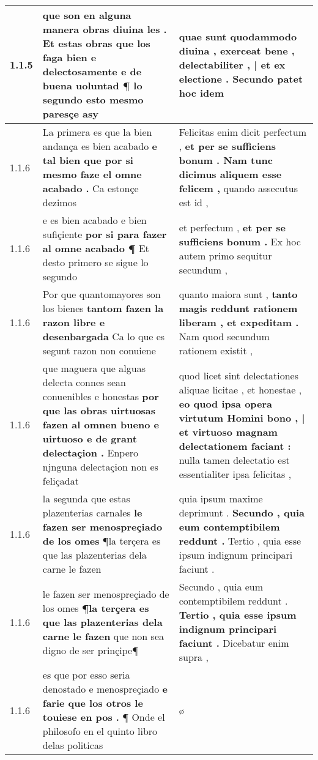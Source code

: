 \begin{tabular}{|p{1cm}|p{6.5cm}|p{6.5cm}|}
1.1.5 & que son en alguna manera obras diuina les . \textbf{ Et estas obras que los faga bien e delectosamente e de buena uoluntad } ¶ lo segundo esto mesmo paresçe asy & quae sunt quodammodo diuina , \textbf{ exerceat bene , delectabiliter , | et ex electione . } Secundo patet hoc idem \\\hline
1.1.6 & La primera es que la bien andança es bien acabado \textbf{ e tal bien que por si mesmo faze el omne acabado . } Ca estonçe dezimos & Felicitas enim dicit perfectum , \textbf{ et per se sufficiens bonum . Nam tunc dicimus aliquem esse felicem , } quando assecutus est id , \\\hline
1.1.6 & e es bien acabado e bien sufiçiente \textbf{ por si para fazer al omne acabado ¶ } Et desto primero se sigue lo segundo & et perfectum , \textbf{ et per se sufficiens bonum . } Ex hoc autem primo sequitur secundum , \\\hline
1.1.6 & Por que quantomayores son los bienes \textbf{ tantom fazen la razon libre e desenbargada } Ca lo que es segunt razon non conuiene & quanto maiora sunt , \textbf{ tanto magis reddunt rationem liberam , et expeditam . } Nam quod secundum rationem existit , \\\hline
1.1.6 & que maguera que alguas delecta connes sean conuenibles e honestas \textbf{ por que las obras uirtuosas fazen al omnen bueno e uirtuoso e de grant delectaçion . } Enpero njnguna delectaçion non es feliçadat & quod licet sint delectationes aliquae licitae , et honestae , \textbf{ eo quod ipsa opera virtutum Homini bono , | et virtuoso magnam delectationem faciant : } nulla tamen delectatio est essentialiter ipsa felicitas , \\\hline
1.1.6 & la segunda que estas plazenterias carnales \textbf{ le fazen ser menospreçiado de los omes } ¶la terçera es que las plazenterias dela carne le fazen & quia ipsum maxime deprimunt . \textbf{ Secundo , quia eum contemptibilem reddunt . } Tertio , quia esse ipsum indignum principari faciunt . \\\hline
1.1.6 & le fazen ser menospreçiado de los omes \textbf{ ¶la terçera es que las plazenterias dela carne le fazen } que non sea digno de ser prinçipe¶ & Secundo , quia eum contemptibilem reddunt . \textbf{ Tertio , quia esse ipsum indignum principari faciunt . } Dicebatur enim supra , \\\hline
1.1.6 & es que por esso seria denostado e menospreçiado \textbf{ e farie que los otros le touiese en pos . } ¶ Onde el philosofo en el quinto libro delas politicas & ø \\\hline

\end{tabular}

